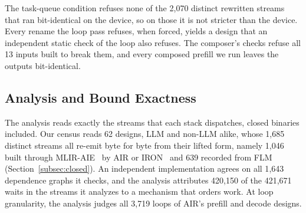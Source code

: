 The task-queue condition refuses none of the 2{,}070 distinct rewritten streams that ran bit-identical on the device, so on those it is not stricter than the device.
Every rename the loop pass refuses, when forced, yields a design that an independent static check of the loop also refuses.
The composer's checks refuse all 13 inputs built to break them, and every composed prefill we run leaves the outputs bit-identical.

\subsection{Analysis and Bound Exactness}
\label{subsec:census}

The analysis reads exactly the streams that each stack dispatches, closed binaries included.
Our census reads 62 designs, LLM and non-LLM alike, whose 1{,}685 distinct streams all re-emit byte for byte from their lifted form, namely 1{,}046 built through MLIR-AIE~\citep{mlir-aie-repo} by AIR or IRON~\citep{hunhoff2025iron} and 639 recorded from FLM (Section~\ref{subsec:closed}).
An independent implementation agrees on all 1{,}643 dependence graphs it checks, and the analysis attributes 420{,}150 of the 421{,}671 waits in the streams it analyzes to a mechanism that orders work.
At loop granularity, the analysis judges all 3{,}719 loops of AIR's prefill and decode designs.

